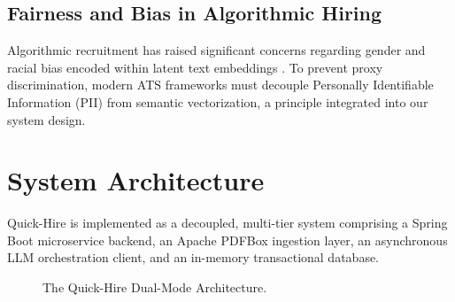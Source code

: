 \documentclass[conference]{IEEEtran}
\begin{document}
\subsection{Fairness and Bias in Algorithmic Hiring}
Algorithmic recruitment has raised significant concerns regarding gender and racial bias encoded within latent text embeddings \cite{raghavan2020mitigating, dwork2012fairness}. To prevent proxy discrimination, modern ATS frameworks must decouple Personally Identifiable Information (PII) from semantic vectorization, a principle integrated into our system design.

\section{System Architecture}
Quick-Hire is implemented as a decoupled, multi-tier system comprising a Spring Boot microservice backend, an Apache PDFBox ingestion layer, an asynchronous LLM orchestration client, and an in-memory transactional database.

\begin{figure}[htbp]
\centering
{}
\caption{The Quick-Hire Dual-Mode Architecture.}
\label{fig:arch}
\end{figure}
\end{document}
